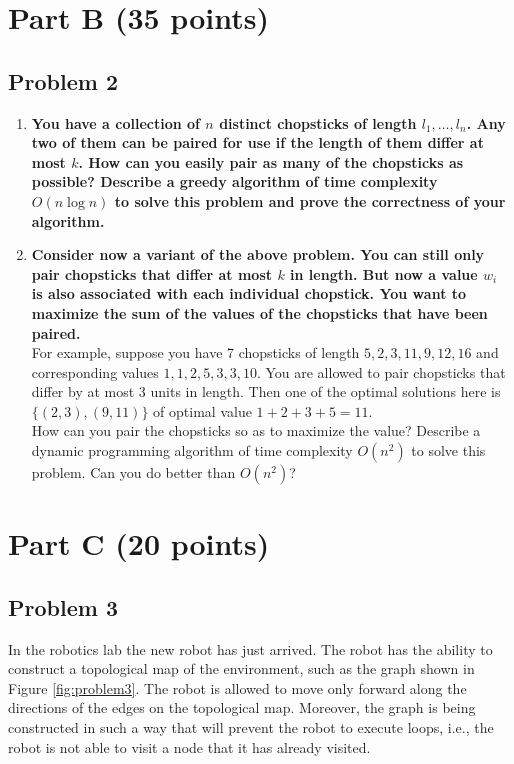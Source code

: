 \documentclass[11pt]{article}
\begin{document}
\section*{Part B (35 points)}

\subsection*{Problem 2}

\begin{enumerate}[label=\Alph*.]

\item \textbf{You have a collection of $n$ distinct chopsticks of
length $l_{1},\dots,l_{n}$. Any two of them can be paired for use if
the length of them differ at most $k$. How can you easily pair as many
of the chopsticks as possible? Describe a greedy algorithm of time
complexity $O(n\log n)$ to solve this problem and prove the
correctness of your algorithm.}\\

\item \textbf{Consider now a variant of the above problem. You
can still only pair chopsticks that differ at most $k$ in length. But
now a value $w_{i}$ is also associated with each individual
chopstick. You want to maximize the sum of the values of the
chopsticks that have been paired.}\\

\noindent For example, suppose you have 7 chopsticks of length
$5,2,3,11,9,12,16$ and corresponding values $1,1,2,5,3,3,10$. You are
allowed to pair chopsticks that differ by at most 3 units in
length. Then one of the optimal solutions here is $\{ (2,3),(9,11) \}$
of optimal value $1+2+3+5=11$.\\

\noindent How can you pair the chopsticks so as to maximize the value?
Describe a dynamic programming algorithm of time complexity $O(n^{2})$
to solve this problem. Can you do better than $O(n^{2})$?\\

\end{enumerate}

\section*{Part C (20 points)}

\subsection*{Problem 3} In the robotics lab the new robot has just
arrived. The robot has the ability to construct a topological map of
the environment, such as the graph shown in Figure
\ref{fig:problem3}. The robot is allowed to move only forward along
the directions of the edges on the topological map. Moreover, the
graph is being constructed in such a way that will prevent the robot
to execute loops, i.e., the robot is not able to visit a node that it
has already visited.\\
\end{document}
